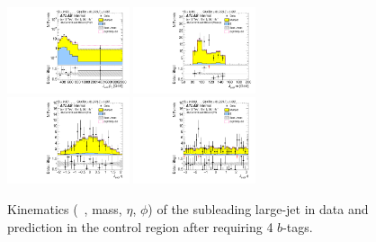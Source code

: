 \begin{figure}[htbp!]
\begin{center}
\includegraphics[width=0.32\textwidth,angle=-90]{figures/boosted/Control/b77_FourTag_Control_sublHCand_Pt_m_1.pdf}
\includegraphics[width=0.32\textwidth,angle=-90]{figures/boosted/Control/b77_FourTag_Control_sublHCand_Mass_s.pdf}\\
\includegraphics[width=0.32\textwidth,angle=-90]{figures/boosted/Control/b77_FourTag_Control_sublHCand_Eta.pdf}
\includegraphics[width=0.32\textwidth,angle=-90]{figures/boosted/Control/b77_FourTag_Control_sublHCand_Phi.pdf}
  \caption{Kinematics (\pt~, mass, $\eta$, $\phi$) of the subleading large-\R jet in data and prediction in the control region after requiring 4 $b$-tags. }
  \label{fig:boosted-4b-control-ak10-subl}
\end{center}
\end{figure}

